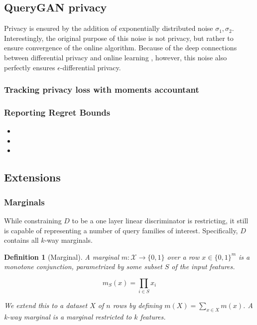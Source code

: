 \documentclass[]{article}
\newcommand{\X}{\mathcal{X}}
\newcommand{\B}{\{0,1\}}
\newtheorem{definition}{Definition}
\begin{document}

\subsection{QueryGAN privacy}
Privacy is ensured by the addition of exponentially distributed noise $\sigma_1, \sigma_2$. Interestingly, the original purpose of this noise is not privacy, but rather to ensure convergence of the online algorithm. Because of the deep connections between differential privacy and online learning \cite{NRVW19} \cite{GHM19}, however, this noise also perfectly ensures $\epsilon$-differential privacy. 

\subsubsection{Tracking privacy loss with moments accountant}
\todo{}

\subsubsection{Reporting Regret Bounds}
\begin{itemize}
    \item {}
    \item {}
    \item {}
\end{itemize}

\subsection{Extensions}
\subsubsection{Marginals}

While constraining $D$ to be a one layer linear discriminator is restricting, it still is capable of representing a number of query families of interest. Specifically, $D$ contains all $k$-way marginals.

\begin{definition}[Marginal]
    A marginal $m: \X \to \B$ over a row $x \in \{0,1\}^m$ is a monotone conjunction, parametrized by some subset $S$ of the input features.  

    \begin{equation}
        m_S(x) = \prod_{i \in S} x_i
    \end{equation}
    
    We extend this to a dataset $X$ of $n$ rows by defining $m(X) = \sum_{x \in X} m(x)$. A k-way marginal is a marginal restricted to $k$ features.
\end{definition} \cite{DR13}
\end{document}
